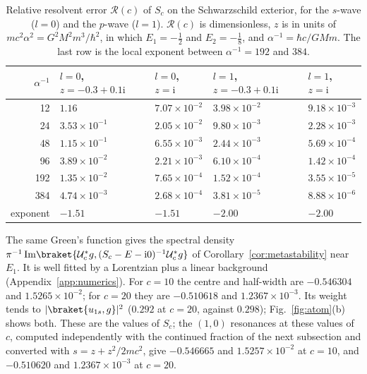 \documentclass[%
 aip,
 jmp,
 amsmath,amssymb,
 reprint, onecolumn
]{revtex4-1}
\theoremstyle{definition}
\theoremstyle{remark}
\newcommand{\rmi}{\mathrm{i}}
\begin{document}
\begin{table}[htb]
\caption{Relative resolvent error $\mathcal{R}(c)$ of $S_c$ on the
Schwarzschild exterior, for the $s$-wave ($l=0$) and the $p$-wave
($l=1$). $\mathcal{R}(c)$ is dimensionless, $z$ is in units of
$mc^2\alpha^2=G^2M^2m^3/\hbar^2$, in which $E_1=-\frac12$ and
$E_2=-\frac18$, and $\alpha^{-1}=\hbar c/GMm$. The last row is the local
exponent between $\alpha^{-1}=192$ and $384$.}
\label{tab:schw}
\begin{ruledtabular}
\begin{tabular}{rllll}
$\alpha^{-1}$ & $l=0$, $z=-0.3+0.1\rmi$ & $l=0$, $z=\rmi$ & $l=1$, $z=-0.3+0.1\rmi$ & $l=1$, $z=\rmi$\\
\hline
12 & $1.16$ & $7.07\times10^{-2}$ & $3.98\times10^{-2}$ & $9.18\times10^{-3}$\\
24 & $3.53\times10^{-1}$ & $2.05\times10^{-2}$ & $9.80\times10^{-3}$ & $2.28\times10^{-3}$\\
48 & $1.15\times10^{-1}$ & $6.55\times10^{-3}$ & $2.44\times10^{-3}$ & $5.69\times10^{-4}$\\
96 & $3.89\times10^{-2}$ & $2.21\times10^{-3}$ & $6.10\times10^{-4}$ & $1.42\times10^{-4}$\\
192 & $1.35\times10^{-2}$ & $7.65\times10^{-4}$ & $1.52\times10^{-4}$ & $3.55\times10^{-5}$\\
384 & $4.74\times10^{-3}$ & $2.68\times10^{-4}$ & $3.81\times10^{-5}$ & $8.88\times10^{-6}$\\
\hline
exponent & $-1.51$ & $-1.51$ & $-2.00$ & $-2.00$\\
\end{tabular}
\end{ruledtabular}
\end{table}

The same Green's function gives the spectral density $\pi^{-1}\,
\mathrm{Im}\braket{\mathcal{U}_c^*g,(S_c-E-\rmi0)^{-1}
\mathcal{U}_c^*g}$ of Corollary~\ref{cor:metastability} near $E_1$. It is
well fitted by a Lorentzian plus a linear background
(Appendix~\ref{app:numerics}). For $c=10$ the centre and half-width are
$-0.546304$ and
$1.5265\times10^{-2}$; for $c=20$ they are $-0.510618$ and
$1.2367\times10^{-3}$. Its weight tends to $|\braket{u_{1s},g}|^2$
($0.292$ at $c=20$, against $0.298$); Fig.~\ref{fig:atom}(b) shows
both. These are the values of $S_c$; the $(1,0)$ resonances at these
values of $c$, computed independently with the continued fraction of
the next subsection and converted with $s=z+z^2/2mc^2$, give $-0.546665$ and $1.5257\times10^{-2}$ at
$c=10$, and $-0.510620$ and $1.2367\times10^{-3}$ at $c=20$.
\end{document}
